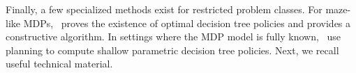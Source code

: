 Finally, a few specialized methods exist for restricted problem classes. For maze-like MDPs,~\cite{theory1} proves the existence of optimal decision tree policies and provides a constructive algorithm.
In settings where the MDP model is fully known,~\cite{dt-opt-mdp} use planning to compute shallow parametric decision tree policies. Next, we recall useful technical material.